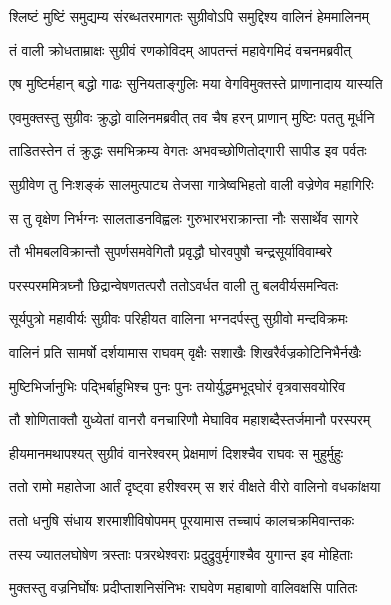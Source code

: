 \twolineshloka
{श्लिष्टं मुष्टिं समुद्यम्य संरब्धतरमागतः}
{सुग्रीवोऽपि समुद्दिश्य वालिनं हेममालिनम्} %

\twolineshloka
{तं वाली क्रोधताम्राक्षः सुग्रीवं रणकोविदम्}
{आपतन्तं महावेगमिदं वचनमब्रवीत्} %

\twolineshloka
{एष मुष्टिर्महान् बद्धो गाढः सुनियताङ्गुलिः}
{मया वेगविमुक्तस्ते प्राणानादाय यास्यति} %

\twolineshloka
{एवमुक्तस्तु सुग्रीवः क्रुद्धो वालिनमब्रवीत्}
{तव चैष हरन् प्राणान् मुष्टिः पततु मूर्धनि} %

\twolineshloka
{ताडितस्तेन तं क्रुद्धः समभिक्रम्य वेगतः}
{अभवच्छोणितोद्गारी सापीड इव पर्वतः} %

\twolineshloka
{सुग्रीवेण तु निःशङ्कं सालमुत्पाट्य तेजसा}
{गात्रेष्वभिहतो वाली वज्रेणेव महागिरिः} %

\twolineshloka
{स तु वृक्षेण निर्भग्नः सालताडनविह्वलः}
{गुरुभारभराक्रान्ता नौः ससार्थेव सागरे} %

\twolineshloka
{तौ भीमबलविक्रान्तौ सुपर्णसमवेगितौ}
{प्रवृद्धौ घोरवपुषौ चन्द्रसूर्याविवाम्बरे} %

\twolineshloka
{परस्परममित्रघ्नौ छिद्रान्वेषणतत्परौ}
{ततोऽवर्धत वाली तु बलवीर्यसमन्वितः} %

\twolineshloka
{सूर्यपुत्रो महावीर्यः सुग्रीवः परिहीयत}
{वालिना भग्नदर्पस्तु सुग्रीवो मन्दविक्रमः} %

\twolineshloka
{वालिनं प्रति सामर्षो दर्शयामास राघवम्}
{वृक्षैः सशाखैः शिखरैर्वज्रकोटिनिभैर्नखैः} %

\twolineshloka
{मुष्टिभिर्जानुभिः पद्भिर्बाहुभिश्च पुनः पुनः}
{तयोर्युद्धमभूद्घोरं वृत्रवासवयोरिव} %

\twolineshloka
{तौ शोणिताक्तौ युध्येतां वानरौ वनचारिणौ}
{मेघाविव महाशब्दैस्तर्जमानौ परस्परम्} %

\twolineshloka
{हीयमानमथापश्यत् सुग्रीवं वानरेश्वरम्}
{प्रेक्षमाणं दिशश्चैव राघवः स मुहुर्मुहुः} %

\twolineshloka
{ततो रामो महातेजा आर्तं दृष्ट्वा हरीश्वरम्}
{स शरं वीक्षते वीरो वालिनो वधकांक्षया} %

\twolineshloka
{ततो धनुषि संधाय शरमाशीविषोपमम्}
{पूरयामास तच्चापं कालचक्रमिवान्तकः} %

\twolineshloka
{तस्य ज्यातलघोषेण त्रस्ताः पत्ररथेश्वराः}
{प्रदुद्रुवुर्मृगाश्चैव युगान्त इव मोहिताः} %

\twolineshloka
{मुक्तस्तु वज्रनिर्घोषः प्रदीप्ताशनिसंनिभः}
{राघवेण महाबाणो वालिवक्षसि पातितः} %

